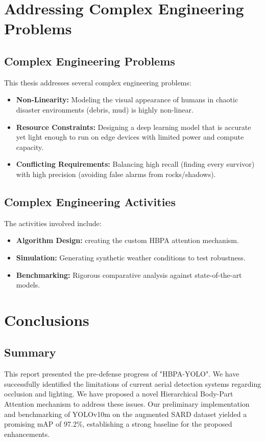 \documentclass[12pt, a4paper]{report}
\begin{document}
\chapter{Addressing Complex Engineering Problems}

\section{Complex Engineering Problems}
This thesis addresses several complex engineering problems:
\begin{itemize}
    \item \textbf{Non-Linearity:} Modeling the visual appearance of humans in chaotic disaster environments (debris, mud) is highly non-linear.
    \item \textbf{Resource Constraints:} Designing a deep learning model that is accurate yet light enough to run on edge devices with limited power and compute capacity.
    \item \textbf{Conflicting Requirements:} Balancing high recall (finding every survivor) with high precision (avoiding false alarms from rocks/shadows).
\end{itemize}

\section{Complex Engineering Activities}
The activities involved include:
\begin{itemize}
    \item \textbf{Algorithm Design:} creating the custom HBPA attention mechanism.
    \item \textbf{Simulation:} Generating synthetic weather conditions to test robustness.
    \item \textbf{Benchmarking:} Rigorous comparative analysis against state-of-the-art models.
\end{itemize}

\chapter{Conclusions}

\section{Summary}
This report presented the pre-defense progress of "HBPA-YOLO". We have successfully identified the limitations of current aerial detection systems regarding occlusion and lighting. We have proposed a novel Hierarchical Body-Part Attention mechanism to address these issues. Our preliminary implementation and benchmarking of YOLOv10m on the augmented SARD dataset yielded a promising mAP of 97.2\%, establishing a strong baseline for the proposed enhancements.
\end{document}
